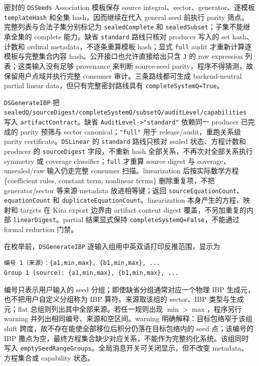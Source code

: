﻿\documentclass[a4paper,11pt]{article}
\begin{document}
密封的 \texttt{DSSeeds} Association 模板保存 source integral、sector、generator、逐模板 \texttt{templateHash} 和全集 hash，因而继续在代入 general seed 前执行 parity 筛点。完整列表与合法子集分别标记为 \texttt{sealedComplete} 和 \texttt{sealedSubset}；子集不能继承全集的 complete 能力。缺省 \texttt{standard} 路线只核对 producer 写入的 set hash、计数和 ordinal metadata，不逐条重算模板 hash；显式 \texttt{full} audit 才重新计算逐模板与完整集合内容 hash。公开接口也允许直接给出只含 \texttt{J} 的 raw expression 列表；这类输入没有足够 provenance 来判断 source-seed parity，程序不得猜测，故保留用户点域并执行完整 consumer 审计。三条路线都可生成 backend-neutral partial linear data，但只有完整密封路线具有 \texttt{completeSystemQ=True}。

\texttt{DSGenerateIBP} 把 \texttt{sealedQ/sourceDigest/completeSystemQ/subsetQ/auditLevel/capabilities} 写入 \texttt{artifactContract}。缺省 \texttt{AuditLevel->"standard"} 依赖同一 producer 已完成的 parity 预筛与 sector canonical；\texttt{"full"} 用于 release/audit，重跑关系级 parity certificate。\texttt{DSLinear} 的 \texttt{standard} 路线只核对 sealed 状态、方程计数和 producer 的 \texttt{sourceDigest} 字段，不重新 hash 全部关系，不再次对全部关系执行 symmetry 或 coverage classifier；\texttt{full} 才重算 source digest 与 coverage，unsealed/raw 输入仍走完整 consumer 扫描。linearization 后按实际数学方程 \{coefficient rules, constant term, nonlinear terms\} 删除重复项，不把 generator/sector 等来源 metadata 放进相等键；返回 \texttt{sourceEquationCount}、\texttt{equationCount} 和 \texttt{duplicateEquationCount}。linearization 本身产生的方程、映射和 targets 在 Kira export 边界由 artifact content digest 覆盖，不另加重复的内部 \texttt{linearDigest}。partial 结果显式保持 \texttt{completeSystemQ=False}，不能通过 formal reduction 门禁。

在枚举前，\texttt{DSGenerateIBP} 逐输入组用中英双语打印反推范围，显示为
\begin{verbatim}
编号 1（来源）：{a1,min,max}, {b1,min,max}, ...
Group 1 (source): {a1,min,max}, {b1,min,max}, ...
\end{verbatim}
编号只表示用户输入的 seed 分组；即使缺省分组通常对应一个物理 IBP 生成元，也不把用户自定义分组称为 IBP 算符。来源取该组的 sector、IBP 类型与生成元；flat 总组则列出其中全部来源。若任一规则出现 $\min>\max$，程序另行 warning 并列出相同编号、来源和空区间。warning 明确解释：目标包络窄于该组 shift 跨度，故不存在能使全部移位后积分仍落在目标包络内的 seed 点；该编号的 IBP 撒点为空，最终方程集合缺少对应关系，不能作为完整约化系统。该组同时写入 \texttt{emptySeedRangeGroups}。全局消息开关可关闭显示，但不改变 metadata、方程集合或 capability 状态。
\end{document}
